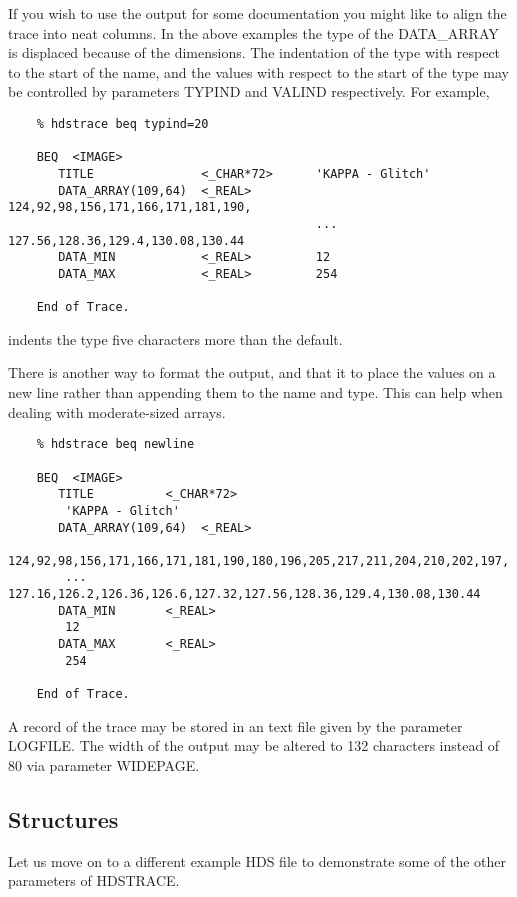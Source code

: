 If you wish to use the output for some documentation you might like
to align the trace into neat columns.  In the above examples the
type of the DATA\_ARRAY is displaced because of the dimensions.  The
indentation of the type with respect to the start of the name, and the
values with respect to the start of the type may be controlled by
parameters TYPIND and VALIND respectively.  For example,

\small
\begin{verbatim}
    % hdstrace beq typind=20

    BEQ  <IMAGE>
       TITLE               <_CHAR*72>      'KAPPA - Glitch'
       DATA_ARRAY(109,64)  <_REAL>         124,92,98,156,171,166,171,181,190,
                                           ... 127.56,128.36,129.4,130.08,130.44
       DATA_MIN            <_REAL>         12
       DATA_MAX            <_REAL>         254

    End of Trace.
\end{verbatim}
\normalsize
indents the type five characters more than the default.

There is another way to format the output, and that it to place the
values on a new line rather than appending them to the name and type.
This can help when dealing with moderate-sized arrays.

\small
\begin{verbatim}
    % hdstrace beq newline

    BEQ  <IMAGE>
       TITLE          <_CHAR*72>
        'KAPPA - Glitch'
       DATA_ARRAY(109,64)  <_REAL>
        124,92,98,156,171,166,171,181,190,180,196,205,217,211,204,210,202,197,
        ... 127.16,126.2,126.36,126.6,127.32,127.56,128.36,129.4,130.08,130.44
       DATA_MIN       <_REAL>
        12
       DATA_MAX       <_REAL>
        254

    End of Trace.
\end{verbatim}
\normalsize
A record of the trace may be stored in an text file given by the
parameter LOGFILE.  The width of the output may be altered to 132
characters instead of 80 via parameter WIDEPAGE.

\subsection{Structures}

Let us move on to a different example HDS file to demonstrate some of
the other parameters of {\footnotesize HDSTRACE}.


